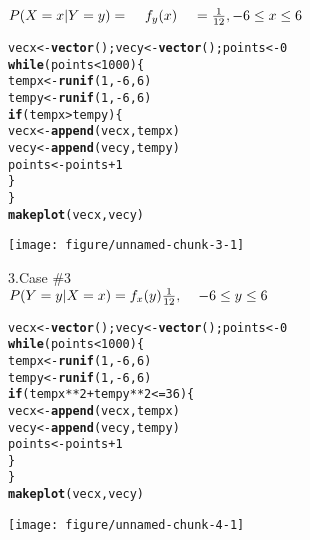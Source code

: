 \documentclass[11]{article}\usepackage[]{graphicx}\usepackage[]{color}
\makeatletter
\def\maxwidth{ %
  \ifdim\Gin@nat@width>\linewidth
    \linewidth
  \else
    \Gin@nat@width
  \fi
}
\newcommand{\hlnum}[1]{\textcolor[rgb]{0.686,0.059,0.569}{#1}}%
\newcommand{\hlopt}[1]{\textcolor[rgb]{0,0,0}{#1}}%
\newcommand{\hlstd}[1]{\textcolor[rgb]{0.345,0.345,0.345}{#1}}%
\newcommand{\hlkwa}[1]{\textcolor[rgb]{0.161,0.373,0.58}{\textbf{#1}}}%
\newcommand{\hlkwb}[1]{\textcolor[rgb]{0.69,0.353,0.396}{#1}}%
\newcommand{\hlkwd}[1]{\textcolor[rgb]{0.737,0.353,0.396}{\textbf{#1}}}%
\newenvironment{kframe}{%
 \def\at@end@of@kframe{}%
 \ifinner\ifhmode%
  \def\at@end@of@kframe{\end{minipage}}%
  \begin{minipage}{\columnwidth}%
 \fi\fi%
 \def\FrameCommand##1{\hskip\@totalleftmargin \hskip-\fboxsep
 \colorbox{shadecolor}{##1}\hskip-\fboxsep
     \hskip-\linewidth \hskip-\@totalleftmargin \hskip\columnwidth}%
 \MakeFramed {\advance\hsize-\width
   \@totalleftmargin\z@ \linewidth\hsize
   \@setminipage}}%
 {\par\unskip\endMakeFramed%
 \at@end@of@kframe}
\newenvironment{knitrout}{}{} %
\makeatother
\begin{document}
\begin{flushleft}
$ P(X=x | Y=y) = \hspace{4 mm} f_{y}(x) \hspace{4 mm} = \frac{1}{12} , -6 \leq x \leq 6$  
\begin{knitrout}
\color{fgcolor}\begin{kframe}
\begin{alltt}
\hlstd{vecx}\hlkwb{<-}\hlkwd{vector}\hlstd{();vecy}\hlkwb{<-}\hlkwd{vector}\hlstd{();points}\hlkwb{<-}\hlnum{0}
\hlkwa{while}\hlstd{(points}\hlopt{<} \hlnum{1000}\hlstd{)\{}
  \hlstd{tempx}\hlkwb{<-}\hlkwd{runif}\hlstd{(}\hlnum{1}\hlstd{,} \hlopt{-}\hlnum{6}\hlstd{,}\hlnum{6}\hlstd{)}
  \hlstd{tempy}\hlkwb{<-}\hlkwd{runif}\hlstd{(}\hlnum{1}\hlstd{,} \hlopt{-}\hlnum{6}\hlstd{,}\hlnum{6}\hlstd{)}
  \hlkwa{if} \hlstd{(tempx} \hlopt{>} \hlstd{tempy)\{}
    \hlstd{vecx}\hlkwb{<-}\hlkwd{append}\hlstd{(vecx, tempx)}
    \hlstd{vecy}\hlkwb{<-}\hlkwd{append}\hlstd{(vecy,tempy)}
   \hlstd{points}\hlkwb{<-} \hlstd{points} \hlopt{+}\hlnum{1}
  \hlstd{\}}
\hlstd{\}}
\hlkwd{makeplot}\hlstd{(vecx,vecy)}
\end{alltt}
\end{kframe}
\texttt{[image: figure/unnamed-chunk-3-1]} 

\end{knitrout}

\vspace{3 mm}
3.Case \#3\\
$P(Y=y | X=x) = f_{x}(y) \frac{1}{12}, \hspace{4 mm} -6 \leq y \leq 6$\\
\begin{knitrout}
\color{fgcolor}\begin{kframe}
\begin{alltt}
\hlstd{vecx}\hlkwb{<-}\hlkwd{vector}\hlstd{();vecy}\hlkwb{<-}\hlkwd{vector}\hlstd{();points}\hlkwb{<-}\hlnum{0}
\hlkwa{while}\hlstd{(points}\hlopt{<} \hlnum{1000}\hlstd{)\{}
  \hlstd{tempx}\hlkwb{<-}\hlkwd{runif}\hlstd{(}\hlnum{1}\hlstd{,} \hlopt{-}\hlnum{6}\hlstd{,}\hlnum{6}\hlstd{)}
  \hlstd{tempy}\hlkwb{<-}\hlkwd{runif}\hlstd{(}\hlnum{1}\hlstd{,} \hlopt{-}\hlnum{6}\hlstd{,}\hlnum{6}\hlstd{)}
  \hlkwa{if} \hlstd{(tempx}\hlopt{**}\hlnum{2} \hlopt{+} \hlstd{tempy}\hlopt{**}\hlnum{2} \hlopt{<=} \hlnum{36}\hlstd{)\{}
    \hlstd{vecx}\hlkwb{<-}\hlkwd{append}\hlstd{(vecx, tempx)}
    \hlstd{vecy}\hlkwb{<-}\hlkwd{append}\hlstd{(vecy,tempy)}
    \hlstd{points}\hlkwb{<-} \hlstd{points} \hlopt{+}\hlnum{1}
  \hlstd{\}}
\hlstd{\}}
\hlkwd{makeplot}\hlstd{(vecx,vecy)}
\end{alltt}
\end{kframe}
\texttt{[image: figure/unnamed-chunk-4-1]} 

\end{knitrout}

\end{flushleft}\
\end{document}
